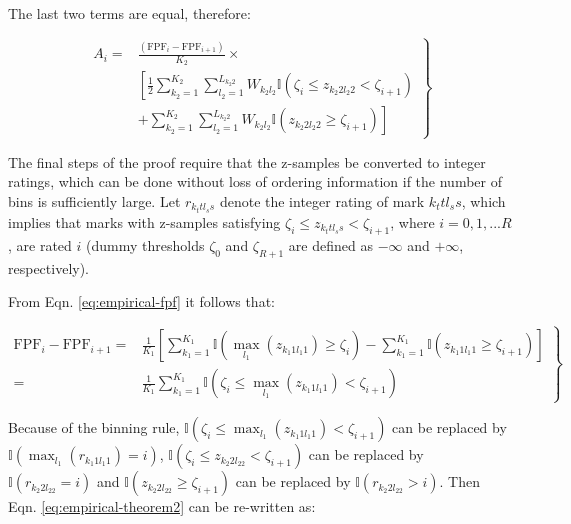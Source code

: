 \documentclass[
]{book}
\begin{document}
The last two terms are equal, therefore:

\begin{equation}
\left. 
\begin{aligned}
A_i =& \frac{\left (\text{FPF}_i - \text{FPF}_{i+1}\right )}{K_2} \times \\ 
& \left[ \frac{1}{2} \sum_{k_2=1}^{K_2}\sum_{l_2=1}^{L_{k_2 2}}W_{k_2 l_2} \mathbb{I}\left ( \zeta_{i} \leq z_{k_2 2 l_2 2} < \zeta_{i+1} \right ) \right. \\
& +\left. \sum_{k_2=1}^{K_2}\sum_{l_2=1}^{L_{k_2 2}}W_{k_2 l_2} \mathbb{I}\left ( z_{k_2 2 l_2 2} \geq \zeta_{i+1} \right ) \right]  
\end{aligned}
\right \} 
\label{eq:empirical-theorem3}
\end{equation}

The final steps of the proof require that the z-samples be converted to integer ratings, which can be done without loss of ordering information if the number of bins is sufficiently large. Let \(r_{k_t t l_s s}\) denote the integer rating of mark \(k_t tl_s s\), which implies that marks with z-samples satisfying \(\zeta_i \leq z_{k_t tl_s s} < \zeta_{i+1}\), where \(i=0,1,...R\), are rated \(i\) (dummy thresholds \(\zeta_0\) and \(\zeta_{R+1}\) are defined as \(-\infty\) and \(+\infty\), respectively).

From Eqn. \eqref{eq:empirical-fpf} it follows that:

\begin{equation}
\left. 
\begin{aligned}
\text{FPF}_i - \text{FPF}_{i+1}=& \frac{1}{K_1} \left[ \sum_{k_1=1}^{K_1} \mathbb{I}\left ( \max_{l_1} \left (z_{k_1 1 l_1 1}  \right ) \geq \zeta_i \right ) - \sum_{k_1=1}^{K_1} \mathbb{I}\left ( z_{k_1 1 l_1 1} \geq \zeta_{i+1} \right ) \right] \\
=& \frac{1}{K_1} \sum_{k_1=1}^{K_1} \mathbb{I}\left ( \zeta_i \leq \max_{l_1} \left (z_{k_1 1 l_1 1}  \right ) < \zeta_{i+1} \right ) 
\end{aligned}
\right \} 
\label{eq:empirical-theorem4}
\end{equation}

Because of the binning rule, \(\mathbb{I}\left ( \zeta_i \leq \max_{l_1} \left (z_{k_1 1 l_1 1} \right ) < \zeta_{i+1} \right )\) can be replaced by \(\mathbb{I}\left ( \max_{l_1} \left (r_{k_1 1 l_1 1} \right ) = i \right )\), \(\mathbb{I}\left ( \zeta_i \leq z_{k_2 2l_22} < \zeta_{i+1} \right )\) can be replaced by \(\mathbb{I}\left ( r_{k_2 2l_22} = i \right )\) and \(\mathbb{I}\left (z_{k_2 2l_22} \geq \zeta_{i+1} \right )\) can be replaced by \(\mathbb{I}\left (r_{k_2 2l_22} > i \right )\). Then Eqn. \eqref{eq:empirical-theorem2} can be re-written as:
\end{document}

